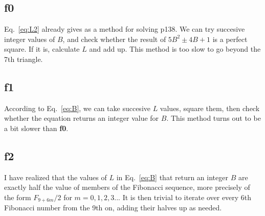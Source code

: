\documentclass[english]{article}
\begin{document}
\subsection{f0}

Eq.~\ref{eq:L2} already gives as a method for solving p138. We can try succesive integer values of $B$, and check whether the result of $5B^2\pm 4B+1$ is a perfect square. If it is, calculate $L$ and add up. This method is too slow to go beyond the 7th triangle.

\subsection{f1}

According to Eq.~\ref{eq:B}, we can take succesive $L$ values, square them, then check whether the equation returns an integer value for $B$. This method turns out to be a bit slower than {\bf f0}.

\subsection{f2}

I have realized that the values of $L$ in Eq.~\ref{eq:B} that return an integer $B$ are exactly half the value of members of the Fibonacci sequence, more precisely of the form $F_{9+6m}/2$ for $m = 0, 1, 2, 3...$ It is then trivial to iterate over every 6th Fibonacci number from the 9th on, adding their halves up as needed.
\end{document}
